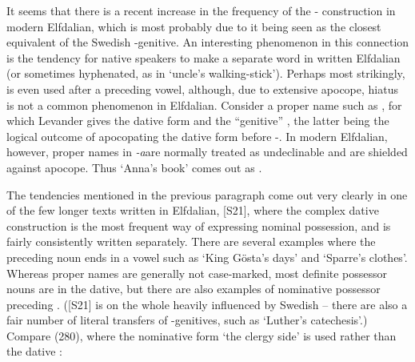 It seems that there is a recent increase in the frequency of the \nobreakdash- construction in modern Elfdalian, which is most probably due to it being seen as the closest equivalent of the Swedish -genitive. An interesting phenomenon in this connection is the tendency for native speakers to make  a separate word in written Elfdalian (or sometimes hyphenated, as in  ‘uncle’s walking-stick’). Perhaps most strikingly,  is even used after a preceding vowel, although, due to extensive apocope, hiatus is not a common phenomenon in Elfdalian. Consider a proper name such as , for which Levander gives the dative form  and the “genitive” , the latter being the logical outcome of apocopating the dative form before {}-. In modern Elfdalian, however, proper names in\textit{ {}-a}\textstyleLinguisticExample{ }are normally treated as undeclinable and are shielded against apocope. Thus ‘Anna’s book’ comes out as . 


The tendencies mentioned in the previous paragraph come out very clearly in one of the few longer texts written in Elfdalian, [S21], where the complex dative construction is the most frequent way of expressing nominal possession, and  is fairly consistently written separately. There are several examples where the preceding noun ends in a vowel such as  ‘King Gösta’s days’ and  ‘Sparre’s clothes’. Whereas proper names are generally not case-marked, most definite possessor nouns are in the dative, but there are also examples of nominative possessor preceding . ([S21] is on the whole heavily influenced by Swedish – there are also a fair number of literal transfers of -genitives, such as ‘Luther’s catechesis’.) Compare (280), where the nominative form  ‘the clergy side’ is used rather than the dative :

